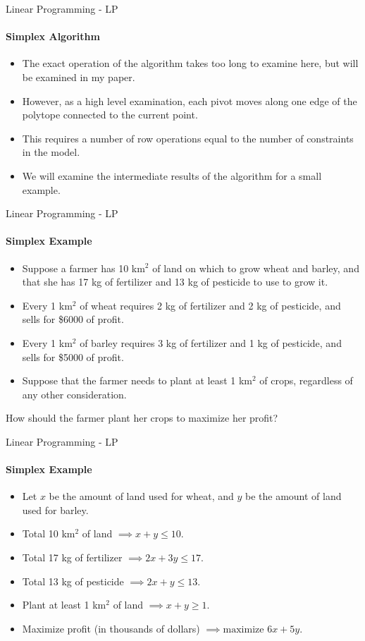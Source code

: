 \documentclass{beamer}
\begin{document}
	\begin{frame}{Linear Programming - LP}
		\framesubtitle{Simplex Algorithm}
		\begin{itemize}
			\item The exact operation of the algorithm takes too long to examine here, but will be examined in my paper.
			\item However, as a high level examination, each pivot moves along one edge of the polytope connected to the current point.
			\item This requires a number of row operations equal to the number of constraints in the model.
			\item We will examine the intermediate results of the algorithm for a small example.
		\end{itemize}
	\end{frame}

	\begin{frame}{Linear Programming - LP}
		\framesubtitle{Simplex Example}
		\begin{itemize}
			\item Suppose a farmer has 10 km$^2$ of land on which to grow wheat and barley, and that she has 17 kg of fertilizer and 13 kg of pesticide to use to grow it. 
			\item Every 1 km$^2$ of wheat requires 2 kg of fertilizer and 2 kg of pesticide, and sells for \$6000 of profit.
			\item Every 1 km$^2$ of barley requires 3 kg of fertilizer and 1 kg of pesticide, and sells for \$5000 of profit. 
			\item Suppose that the farmer needs to plant at least 1 km$^2$ of crops, regardless of any other consideration. 
		\end{itemize}
		How should the farmer plant her crops to maximize her profit?
	\end{frame}
	
	\begin{frame}{Linear Programming - LP}
		\framesubtitle{Simplex Example}
		\begin{itemize}
			\item Let $x$ be the amount of land used for wheat, and $y$ be the amount of land used for barley.
			\item Total 10 km$^2$ of land $\implies x + y\leq 10$.
			\item Total 17 kg of fertilizer $\implies 2x + 3y\leq 17$.
			\item Total 13 kg of pesticide $\implies 2x + y\leq 13$.
			\item Plant at least 1 km$^2$ of land $\implies x + y \geq 1$.
			\item Maximize profit (in thousands of dollars) $\implies \textrm{maximize } 6x + 5y$.
		\end{itemize}
	\end{frame}
\end{document}
